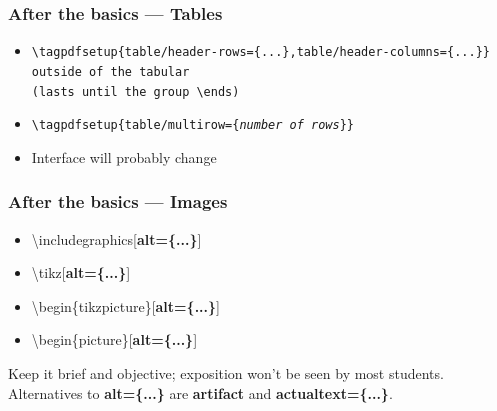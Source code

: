 \documentclass{ltx-talk}
\begin{document}
\begin{frame}
\frametitle{After the basics --- Tables}
\begin{itemize}
\item\texttt{\textbackslash tagpdfsetup\{table/header-rows=\{...\},table/header-columns=\{...\}\}\\
\qquad\qquad \textrm{outside of the} tabular\\
\qquad\qquad \textrm{(lasts until the group} \textbackslash ends)}
\item\texttt{\textbackslash tagpdfsetup\{table/multirow=\{\emph{number of rows}\}\}} 
\item Interface will probably change
\end{itemize}
\end{frame}

\begin{frame}
\frametitle{After the basics --- Images}
\begin{itemize}
\ttfamily
\item\textbackslash includegraphics[\textbf{alt=\{...\}}]
\item\textbackslash tikz[\textbf{alt=\{...\}}]
\item\textbackslash begin\{tikzpicture\}[\textbf{alt=\{...\}}]
\item\textbackslash begin\{picture\}[\textbf{alt=\{...\}}]
\end{itemize}
Keep it brief and objective; exposition won't be seen by most students.\\
Alternatives to {\bfseries\ttfamily alt=\{...\}} are {\bfseries\ttfamily artifact} and {\bfseries\ttfamily actualtext=\{...\}}.
\end{frame}
\end{document}
